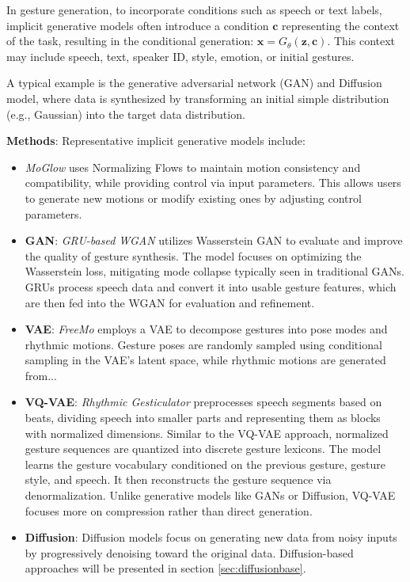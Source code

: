 In gesture generation, to incorporate conditions such as speech or text labels, implicit generative models often introduce a condition $\mathbf{c}$ representing the context of the task, resulting in the conditional generation: $\mathbf{x} = G_\theta(\mathbf{z}, \mathbf{c})$. This context may include speech, text, speaker ID, style, emotion, or initial gestures.

A typical example is the generative adversarial network (GAN) and Diffusion model, where data is synthesized by transforming an initial simple distribution (e.g., Gaussian) into the target data distribution.

\textbf{Methods}: Representative implicit generative models include:

\begin{itemize}
	\item \textit{MoGlow} \cite{henter2020moglow} uses Normalizing Flows to maintain motion consistency and compatibility, while providing control via input parameters. This allows users to generate new motions or modify existing ones by adjusting control parameters.
	
	\item \textbf{GAN}: \textit{GRU-based WGAN} \cite{wu2021probabilistic} utilizes Wasserstein GAN to evaluate and improve the quality of gesture synthesis. The model focuses on optimizing the Wasserstein loss, mitigating mode collapse typically seen in traditional GANs. GRUs process speech data and convert it into usable gesture features, which are then fed into the WGAN for evaluation and refinement.
	
	\item \textbf{VAE}: \textit{FreeMo} \cite{xu2022freeform} employs a VAE to decompose gestures into pose modes and rhythmic motions. Gesture poses are randomly sampled using conditional sampling in the VAE's latent space, while rhythmic motions are generated from...
	
	\item \textbf{VQ-VAE}: \textit{Rhythmic Gesticulator} \cite{ao2022rhythmic} preprocesses speech segments based on beats, dividing speech into smaller parts and representing them as blocks with normalized dimensions. Similar to the VQ-VAE approach, normalized gesture sequences are quantized into discrete gesture lexicons. The model learns the gesture vocabulary conditioned on the previous gesture, gesture style, and speech. It then reconstructs the gesture sequence via denormalization. Unlike generative models like GANs or Diffusion, VQ-VAE focuses more on compression rather than direct generation.
	
	\item \textbf{Diffusion}: Diffusion models focus on generating new data from noisy inputs by progressively denoising toward the original data. Diffusion-based approaches will be presented in section \autoref{sec:diffusionbase}.
\end{itemize}


